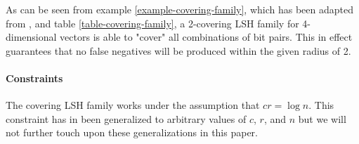 As can be seen from example \ref{example-covering-family}, which has been adapted from \cite[example 2.1]{DBLP:journals/corr/PhamP16}, and table \ref{table-covering-family}, a 2-covering LSH family for 4-dimensional vectors is able to "cover" all combinations of bit pairs. This in effect guarantees that no false negatives will be produced within the given radius of 2.

\paragraph{Constraints} The covering LSH family works under the assumption that $cr = \log n$. This constraint has in \cite{DBLP:journals/corr/Pagh15} been generalized to arbitrary values of $c$, $r$, and $n$ but we will not further touch upon these generalizations in this paper.
